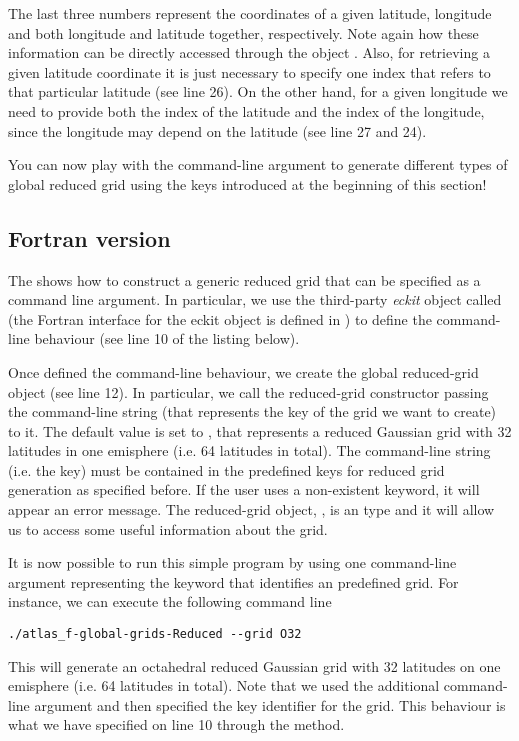 The last three numbers represent the coordinates of a given 
latitude, longitude and both longitude and latitude together, 
respectively. Note again how these information can be directly 
accessed through the object . 
Also, for retrieving a given latitude coordinate it is just 
necessary to specify one index that refers to that particular 
latitude (see line 26). On the other hand, for a given longitude 
we need to provide both the index of the latitude and the index 
of the longitude, since the longitude may depend on the latitude 
(see line 27 and 24).

You can now play with the command-line argument to generate 
different types of global reduced grid using the keys introduced 
at the beginning of this section!

\subsection{Fortran version}
The  shows how to construct a generic 
reduced grid that can be specified as a command line 
argument. In particular, we use the third-party \textit{eckit} 
object called  (the Fortran interface 
for the eckit  object is defined in \Atlas) 
to define the command-line behaviour (see line 10 of the 
listing below). 

%

%

Once defined the command-line behaviour, we create the global 
reduced-grid object (see line 12). In particular, we call 
the reduced-grid constructor passing the command-line string 
(that represents the key of the grid we want to create) to 
it. The default value is set to , that represents 
a reduced Gaussian grid with 32 latitudes in one emisphere 
(i.e. 64 latitudes in total).  
The command-line string (i.e. the key) must be contained 
in the predefined keys for reduced grid generation as specified 
before. If the user uses a non-existent keyword, it will 
appear an error message.
The reduced-grid object, , is 
an  type and it will allow 
us to access some useful information about the grid.  

It is now possible to run this simple program by using 
one command-line argument representing the keyword that 
identifies an \Atlas predefined grid. For instance, we 
can execute the following command line 
%
\begin{lstlisting}[style=BashStyle]
./atlas_f-global-grids-Reduced --grid O32
\end{lstlisting}
% 
This will generate an octahedral reduced Gaussian grid 
with 32 latitudes on one emisphere (i.e. 64 latitudes 
in total).
Note that we used the additional command-line argument 
 and then specified the key identifier 
for the grid. This behaviour is what we have specified 
on line 10 through the  method.

